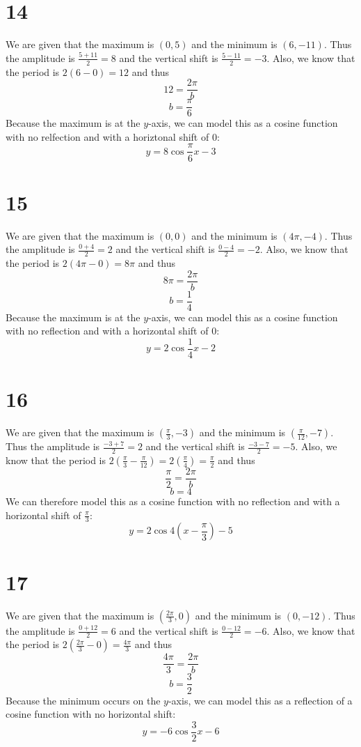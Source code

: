 \documentclass{article}
\theoremstyle{definition}
\newcommand{\?}{\stackrel{?}{=}}
\begin{document}
\section*{14}
We are given that the maximum is $(0,5)$ and the minimum is $(6,-11)$. Thus the amplitude is $\frac{5+11}{2}=8$ and the vertical shift is $\frac{5-11}{2}=-3$. Also, we know that the period is
$2(6-0)=12$ and thus \[ 12=\frac{2\pi}{b} \] \[ b=\frac{\pi}{6} \] Because the maximum is at the $y$-axis, we can model this as a cosine function with no relfection and with a horiztonal shift of 0:
\[ y=8\cos\frac{\pi}{6}x-3 \]

\section*{15}
We are given that the maximum is $(0,0)$ and the minimum is $(4\pi,-4)$. Thus the amplitude is $\frac{0+4}{2}=2$ and the vertical shift is $\frac{0-4}{2}=-2$. Also, we know that the period is
$2(4\pi-0)=8\pi$ and thus \[ 8\pi=\frac{2\pi}{b} \] \[ b=\frac{1}{4} \] Because the maximum is at the $y$-axis, we can model this as a cosine function with no reflection and with a horizontal shift of 0:
\[ y=2\cos\frac{1}{4}x-2 \]

\section*{16}
We are given that the maximum is $(\frac{\pi}{3},-3)$ and the minimum is $(\frac{\pi}{12},-7)$. Thus the amplitude is $\frac{-3+7}{2}=2$ and the vertical shift is $\frac{-3-7}{2}=-5$. Also, we know that the period is 
$2(\frac{\pi}{3}-\frac{\pi}{12})=2(\frac{\pi}{4})=\frac{\pi}{2}$ and thus \[ \frac{\pi}{2}=\frac{2\pi}{b} \] \[ b=4 \] We can therefore model this as a cosine function with no reflection and with a horizontal shift of 
$\frac{\pi}{3}$: \[ y=2\cos 4(x-\frac{\pi}{3})-5 \]

\section*{17}
We are given that the maximum is $(\frac{2\pi}{3},0)$ and the minimum is $(0,-12)$. Thus the amplitude is $\frac{0+12}{2}=6$ and the vertical shift is $\frac{0-12}{2}=-6$. Also, we know that the period is
$2(\frac{2\pi}{3}-0)=\frac{4\pi}{3}$ and thus \[ \frac{4\pi}{3}=\frac{2\pi}{b} \] \[ b=\frac{3}{2} \] Because the minimum occurs on the $y$-axis, we can model this as a reflection of a cosine function with no 
horizontal shift: \[ y=-6\cos\frac{3}{2}x-6 \]
\end{document}
